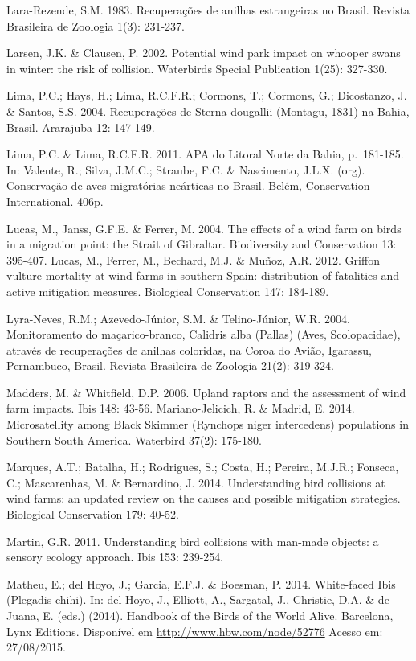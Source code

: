 \documentclass[
]{scrbook}
\begin{document}
Lara-Rezende, S.M. 1983. Recuperações de anilhas estrangeiras no Brasil. Revista Brasileira de Zoologia 1(3): 231-237.

Larsen, J.K. \& Clausen, P. 2002. Potential wind park impact on whooper swans in winter: the risk of collision. Waterbirds Special Publication 1(25): 327-330.

Lima, P.C.; Hays, H.; Lima, R.C.F.R.; Cormons, T.; Cormons, G.; Dicostanzo, J. \& Santos, S.S. 2004. Recuperações de Sterna dougallii (Montagu, 1831) na Bahia, Brasil. Ararajuba 12: 147-149.

Lima, P.C. \& Lima, R.C.F.R. 2011. APA do Litoral Norte da Bahia, p.~181-185. In: Valente, R.; Silva, J.M.C.; Straube, F.C. \& Nascimento, J.L.X. (org). Conservação de aves migratórias neárticas no Brasil. Belém, Conservation International. 406p.

Lucas, M., Janss, G.F.E. \& Ferrer, M. 2004. The effects of a wind farm on birds in a migration point: the Strait of Gibraltar. Biodiversity and Conservation 13: 395-407.
Lucas, M., Ferrer, M., Bechard, M.J. \& Muñoz, A.R. 2012. Griffon vulture mortality at wind farms in southern Spain: distribution of fatalities and active mitigation measures. Biological Conservation 147: 184-189.

Lyra-Neves, R.M.; Azevedo-Júnior, S.M. \& Telino-Júnior, W.R. 2004. Monitoramento do maçarico-branco, Calidris alba (Pallas) (Aves, Scolopacidae), através de recuperações de anilhas coloridas, na Coroa do Avião, Igarassu, Pernambuco, Brasil. Revista Brasileira de Zoologia 21(2): 319-324.

Madders, M. \& Whitfield, D.P. 2006. Upland raptors and the assessment of wind farm impacts. Ibis 148: 43-56.
Mariano-Jelicich, R. \& Madrid, E. 2014. Microsatellity among Black Skimmer (Rynchops niger intercedens) populations in Southern South America. Waterbird 37(2): 175-180.

Marques, A.T.; Batalha, H.; Rodrigues, S.; Costa, H.; Pereira, M.J.R.; Fonseca, C.; Mascarenhas, M. \& Bernardino, J. 2014. Understanding bird collisions at wind farms: an updated review on the causes and possible mitigation strategies. Biological Conservation 179: 40-52.

Martin, G.R. 2011. Understanding bird collisions with man-made objects: a sensory ecology approach. Ibis 153: 239-254.

Matheu, E.; del Hoyo, J.; Garcia, E.F.J. \& Boesman, P. 2014. White-faced Ibis (Plegadis chihi). In: del Hoyo, J., Elliott, A., Sargatal, J., Christie, D.A. \& de Juana, E. (eds.) (2014). Handbook of the Birds of the World Alive. Barcelona, Lynx Editions. Disponível em \url{http://www.hbw.com/node/52776} Acesso em: 27/08/2015.
\end{document}
